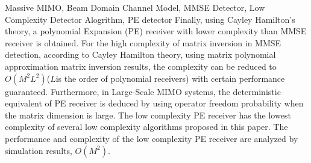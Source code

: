 \documentclass[bachelor,nocolorlinks, printoneside]{seuthesis} %
\begin{document}
\begin{englishabstract}{Massive MIMO, Beam Domain Channel Model, MMSE Detector, Low Complexity Detector Alogrithm, PE detector}
Finally, using Cayley Hamilton's theory, a polynomial Expansion (PE) receiver with lower complexity than MMSE receiver is obtained. For the high complexity of matrix inversion in MMSE detection, according to Cayley Hamilton theory, using matrix polynomial approximation matrix inversion results, the complexity can be reduced to $O(M^2L^2) $($L$is the order of polynomial receivers) with certain performance guaranteed. Furthermore, in Large-Scale MIMO systems, the deterministic equivalent of PE receiver is deduced by using operator freedom probability when the matrix dimension is large. The low complexity PE receiver has the lowest complexity of several low complexity algorithms proposed in this paper. The performance and complexity of the low complexity PE receiver are analyzed by simulation results, $O(M^2)$.
\end{englishabstract}

\tableofcontents
\end{document}
